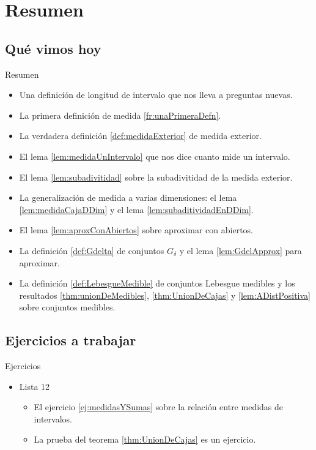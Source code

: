 \documentclass[utf8]{beamer}
\theoremstyle{plain}
\theoremstyle{definition}
\theoremstyle{remark}
\numberwithin{equation}{section}
\newcommand{\dl}{\delta}                %
\renewcommand{\.}{\Cdot}                %
\begin{document}
\section*{Resumen}

\subsection*{Qu\'e vimos hoy}

\begin{frame}{Resumen}

  \begin{itemize}
  \item Una definición de longitud de intervalo que nos lleva a preguntas nuevas.
  \item La primera definición de medida \ref{fr:unaPrimeraDefn}.
  \item La verdadera definición \ref{def:medidaExterior} de medida exterior.
  \item El lema \ref{lem:medidaUnIntervalo} que nos dice cuanto mide un intervalo.
  \item El lema \ref{lem:subadivitidad} sobre la subadivitidad de la medida exterior. 
  \item La generalización de medida a varias dimensiones: el lema \ref{lem:medidaCajaDDim} y el lema \ref{lem:subaditividadEnDDim}.
  \item El lema \ref{lem:aproxConAbiertos} sobre aproximar con abiertos.
  \item La definición \ref{def:Gdelta} de conjuntos $G_\dl$ y el lema \ref{lem:GdelApprox} para aproximar.
  \item La definición \ref{def:LebesgueMedible} de conjuntos Lebesgue medibles y los resultados \ref{thm:unionDeMedibles}, \ref{thm:UnionDeCajas} y \ref{lem:ADistPositiva} sobre conjuntos medibles.
  \end{itemize}
  
\end{frame}

\subsection*{Ejercicios a trabajar}
\begin{frame}{Ejercicios}
    
  \begin{itemize}
    \item
      Lista 12
      \begin{itemize}
      \item El ejercicio \ref{ej:medidasYSumas} sobre la relación entre medidas de intervalos.
      \item La prueba del teorema \ref{thm:UnionDeCajas} es un ejercicio.
      \end{itemize}
    \end{itemize}
  
\end{frame}
\end{document}
